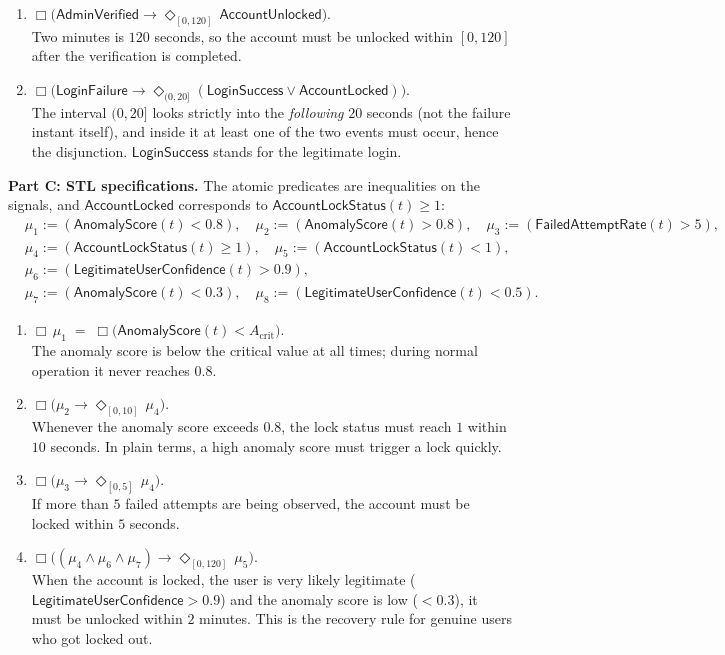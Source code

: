 \documentclass[a4paper, 11pt]{article}
\newcommand{\ap}[1]{\mathsf{#1}}
\newcommand{\LF}{\ap{LoginFailure}}
\newcommand{\LS}{\ap{LoginSuccess}}
\newcommand{\AL}{\ap{AccountLocked}}
\newcommand{\AU}{\ap{AccountUnlocked}}
\newcommand{\AV}{\ap{AdminVerified}}
\newcommand{\AS}{\ap{AnomalyScore}}
\newcommand{\FR}{\ap{FailedAttemptRate}}
\newcommand{\LC}{\ap{LegitimateUserConfidence}}
\newcommand{\LK}{\ap{AccountLockStatus}}
\newcommand{\G}{\Box}
\newcommand{\F}{\Diamond}
\begin{document}
\begin{solution}
\begin{enumerate}
    \item $\G\big(\AV \to \F_{[0,120]}\,\AU\big)$. \\
    Two minutes is $120$ seconds, so the account must be unlocked within $[0,120]$ after the verification is completed.

    \item $\G\big(\LF \to \F_{(0,20]}(\LS \vee \AL)\big)$. \\
    The interval $(0,20]$ looks strictly into the \emph{following} $20$ seconds (not the failure instant itself), and inside it at least one of the two events must occur, hence the disjunction. $\LS$ stands for the legitimate login.
\end{enumerate}

\bigskip
\noindent\textbf{Part C: STL specifications.}
The atomic predicates are inequalities on the signals, and $\AL$ corresponds to $\LK(t)\ge 1$:
\begin{align*}
    &\mu_1 := (\AS(t) < 0.8), \quad \mu_2 := (\AS(t) > 0.8), \quad \mu_3 := (\FR(t) > 5),\\
    &\mu_4 := (\LK(t) \ge 1), \quad \mu_5 := (\LK(t) < 1), \\
    &\mu_6 := (\LC(t) > 0.9),\\
    &\mu_7 := (\AS(t) < 0.3), \quad \mu_8 := (\LC(t) < 0.5).
\end{align*}
\begin{enumerate}
    \item $\G\,\mu_1 \;=\; \G\big(\AS(t) < A_{\text{crit}}\big)$. \\
    The anomaly score is below the critical value at all times; during normal operation it never reaches $0.8$.

    \item $\G\big(\mu_2 \to \F_{[0,10]}\,\mu_4\big)$. \\
    Whenever the anomaly score exceeds $0.8$, the lock status must reach $1$ within $10$ seconds. In plain terms, a high anomaly score must trigger a lock quickly.

    \item $\G\big(\mu_3 \to \F_{[0,5]}\,\mu_4\big)$. \\
    If more than $5$ failed attempts are being observed, the account must be locked within $5$ seconds.

    \item $\G\big((\mu_4\wedge\mu_6\wedge\mu_7) \to \F_{[0,120]}\,\mu_5\big)$. \\
    When the account is locked, the user is very likely legitimate ($\LC>0.9$) and the anomaly score is low ($<0.3$), it must be unlocked within $2$ minutes. This is the recovery rule for genuine users who got locked out.


\end{enumerate}
\end{solution}
\end{document}
